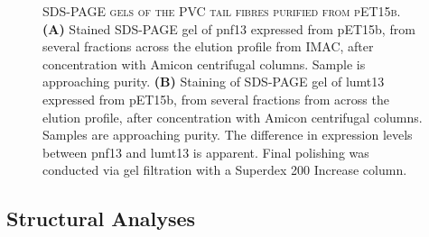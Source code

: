 \begin{figure}[H]
	\vspace{0.2cm}
	\centering
	\begin{subfigure}[h]{0.45\textwidth}
	\captionsetup{singlelinecheck=off, justification=centering, font=footnotesize, aboveskip=10pt}
	\caption{}
	\end{subfigure}
	\quad
	\begin{subfigure}[h]{0.45\textwidth}
	\captionsetup{singlelinecheck=off, justification=centering, font=footnotesize, aboveskip=10pt}
	\caption{}
	\end{subfigure}

	\captionsetup{singlelinecheck=off, justification=justified, font=footnotesize, aboveskip=10pt}
	\caption[Tail fibre chromatographic preparations]{\textsc{\normalsize SDS-PAGE gels of the PVC tail fibres purified from pET15b.} \vspace{0.1cm} \newline
	\textbf{(A)} Stained SDS-PAGE gel of pnf13 expressed from pET15b, from several fractions across the elution profile from IMAC, after concentration with Amicon centrifugal columns. Sample is approaching purity. \textbf{(B)} Staining of SDS-PAGE gel of lumt13 expressed from pET15b, from several fractions from across the elution profile, after concentration with Amicon centrifugal columns. Samples are approaching purity. The difference in expression levels between pnf13 and lumt13 is apparent. Final polishing was conducted via gel filtration with a Superdex 200 Increase column.}
	\label{gelpurifications}
\end{figure}

\subsection{Structural Analyses}

